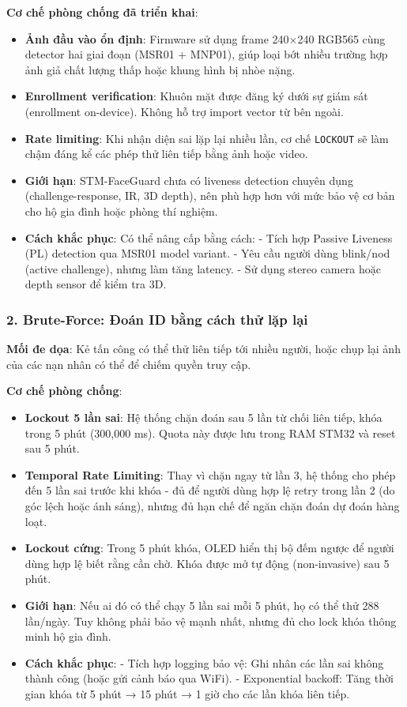 \textbf{Cơ chế phòng chống đã triển khai}:
\begin{itemize}
  \item \textbf{Ảnh đầu vào ổn định}: Firmware sử dụng frame 240$\times$240 RGB565 cùng detector hai giai đoạn (MSR01 + MNP01), giúp loại bớt nhiều trường hợp ảnh giả chất lượng thấp hoặc khung hình bị nhòe nặng.
  \item \textbf{Enrollment verification}: Khuôn mặt được đăng ký dưới sự giám sát (enrollment on-device). Không hỗ trợ import vector từ bên ngoài.
  \item \textbf{Rate limiting}: Khi nhận diện sai lặp lại nhiều lần, cơ chế \texttt{LOCKOUT} sẽ làm chậm đáng kể các phép thử liên tiếp bằng ảnh hoặc video.
  \item \textbf{Giới hạn}: STM-FaceGuard chưa có liveness detection chuyên dụng (challenge-response, IR, 3D depth), nên phù hợp hơn với mức bảo vệ cơ bản cho hộ gia đình hoặc phòng thí nghiệm.
  \item \textbf{Cách khắc phục}: Có thể nâng cấp bằng cách:
    - Tích hợp Passive Liveness (PL) detection qua MSR01 model variant.
    - Yêu cầu người dùng blink/nod (active challenge), nhưng làm tăng latency.
    - Sử dụng stereo camera hoặc depth sensor để kiểm tra 3D.
\end{itemize}

\subsubsection{2. Brute-Force: Đoán ID bằng cách thử lặp lại}

\textbf{Mối đe dọa}: Kẻ tấn công có thể thử liên tiếp tới nhiều người, hoặc chụp lại ảnh của các nạn nhân có thể để chiếm quyền truy cập.

\textbf{Cơ chế phòng chống}:
\begin{itemize}
  \item \textbf{Lockout 5 lần sai}: Hệ thống chặn đoán sau 5 lần từ chối liên tiếp, khóa trong 5 phút (300,000 ms). Quota này được lưu trong RAM STM32 và reset sau 5 phút.
  \item \textbf{Temporal Rate Limiting}: Thay vì chặn ngay từ lần 3, hệ thống cho phép đến 5 lần sai trước khi khóa - đủ để người dùng hợp lệ retry trong lần 2 (do góc lệch hoặc ánh sáng), nhưng đủ hạn chế để ngăn chặn đoán dự đoán hàng loạt.
  \item \textbf{Lockout cứng}: Trong 5 phút khóa, OLED hiển thị bộ đếm ngược để người dùng hợp lệ biết rằng cần chờ. Khóa được mở tự động (non-invasive) sau 5 phút.
  \item \textbf{Giới hạn}: Nếu ai đó có thể chạy 5 lần sai mỗi 5 phút, họ có thể thử 288 lần/ngày. Tuy không phải bảo vệ mạnh nhất, nhưng đủ cho lock khóa thông minh hộ gia đình.
  \item \textbf{Cách khắc phục}: 
    - Tích hợp logging bảo vệ: Ghi nhân các lần sai không thành công (hoặc gửi cảnh báo qua WiFi).
    - Exponential backoff: Tăng thời gian khóa từ 5 phút → 15 phút → 1 giờ cho các lần khóa liên tiếp.
\end{itemize}

